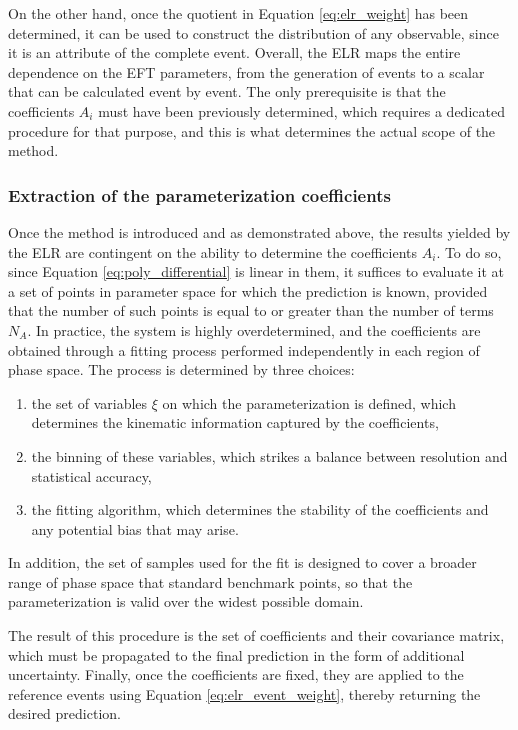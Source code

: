 On the other hand, once the quotient in Equation \ref{eq:elr_weight} has been determined, it can be used to construct the distribution of any observable, since it is an attribute of the complete event. Overall, the ELR maps the entire dependence on the EFT parameters, from the generation of events to a scalar that can be calculated event by event. The only prerequisite is that the coefficients $A_i$ must have been previously determined, which requires a dedicated procedure for that purpose, and this is what determines the actual scope of the method.\medskip

\subsubsection{Extraction of the parameterization coefficients}
\label{subsec:ELR_coefficients}
%
Once the method is introduced and as demonstrated above, the results yielded by the ELR are contingent on the ability to determine the coefficients $A_i$. To do so, since Equation \ref{eq:poly_differential} is linear in them, it suffices to evaluate it at a set of points in parameter space for which the prediction is known, provided that the number of such points is equal to or greater than the number of terms $N_A$. In practice, the system is highly overdetermined, and the coefficients are obtained through a fitting process performed independently in each region of phase space. The process is determined by three choices:
\begin{enumerate}
    \item the set of variables $\xi$ on which the parameterization is defined, which determines the kinematic information captured by the coefficients,
    \item the binning of these variables, which strikes a balance between resolution and statistical accuracy,
    \item the fitting algorithm, which determines the stability of the coefficients and any potential bias that may arise.
\end{enumerate}
%
In addition, the set of samples used for the fit is designed to cover a broader range of phase space that standard benchmark points, so that the parameterization is valid over the widest possible domain.

The result of this procedure is the set of coefficients and their covariance matrix, which must be propagated to the final prediction in the form of additional uncertainty. Finally, once the coefficients are fixed, they are applied to the reference events using Equation \ref{eq:elr_event_weight}, thereby returning the desired prediction.\medskip

